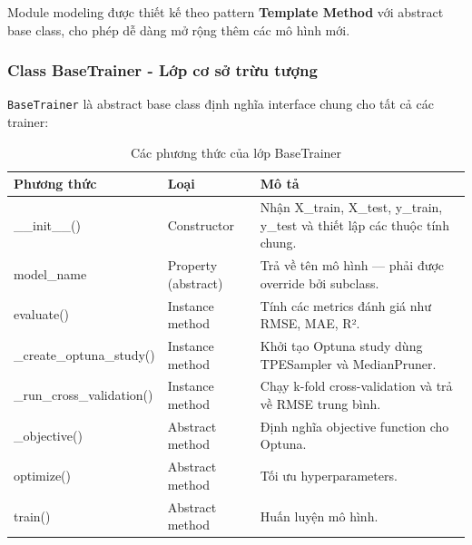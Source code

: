 \documentclass[12pt,a4paper]{article}
\begin{document}
Module modeling được thiết kế theo pattern \textbf{Template Method} với abstract base class, cho phép dễ dàng mở rộng thêm các mô hình mới.

\subsubsection{Class BaseTrainer - Lớp cơ sở trừu tượng}

\texttt{BaseTrainer} là abstract base class định nghĩa interface chung cho tất cả các trainer:

\begin{table}[H]
\centering
\caption{Các phương thức của lớp BaseTrainer}
\label{tab:basetrainer_methods}

\renewcommand{\arraystretch}{1.25} %

{%
\setlength{\tabcolsep}{10pt} %

\begin{tabular}{|>{\ttfamily\raggedright\arraybackslash}p{5cm}  %
                |>{\raggedright\arraybackslash}p{3.2cm} 
                |>{\raggedright\arraybackslash}p{6.6cm}|} %
\hline
\textbf{Phương thức} & \textbf{Loại} & \textbf{Mô tả} \\
\hline

\_\_init\_\_() & Constructor &
Nhận X\_train, X\_test, y\_train, y\_test và thiết lập các thuộc tính chung. \\ \hline

model\_name & Property (abstract) &
Trả về tên mô hình — phải được override bởi subclass. \\ \hline

evaluate() & Instance method &
Tính các metrics đánh giá như RMSE, MAE, R². \\ \hline

\_create\_optuna\_study() & Instance method &
Khởi tạo Optuna study dùng TPESampler và MedianPruner. \\ \hline

\_run\_cross\_validation() & Instance method &
Chạy k-fold cross-validation và trả về RMSE trung bình. \\ \hline

\_objective() & Abstract method &
Định nghĩa objective function cho Optuna. \\ \hline

optimize() & Abstract method &
Tối ưu hyperparameters. \\ \hline

train() & Abstract method &
Huấn luyện mô hình. \\ \hline

\end{tabular}
}%
\end{table}
\end{document}
